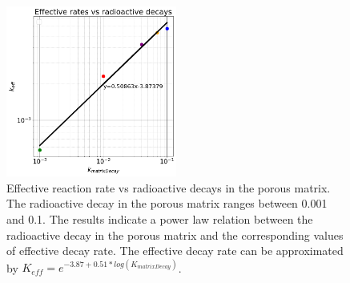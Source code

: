 \documentclass{article}
\begin{document}
\begin{figure}[htbp]
    \centering
    \includegraphics[width=0.5\textwidth]{images/effVsDecayRatesLogLog.png}
    \caption{Effective reaction rate vs radioactive decays in the porous matrix. The radioactive decay in the porous matrix ranges between 0.001 and 0.1. The results indicate a power law relation between the radioactive decay in the porous matrix and the corresponding values of effective decay rate. The effective decay rate can be approximated by $K_{eff} = e^{-3.87+0.51*log(K_{matrixDecay})}$.}
    \label{fig:KeffVsDmLog}
\end{figure}

\FloatBarrier  %
\end{document}
